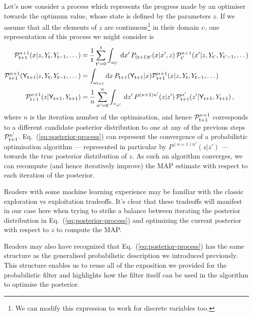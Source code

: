 Let's now consider a process which represents the progress made by an optimiser towards the optimum value, whose state is defined by the parameters $z$. If we assume that all the elements of $z$ are continuous\footnote{We can modify this expression to work for discrete variables too.} in their domain $\upsilon$, one representation of this process we might consider is
\begin{align} 
{\cal P}^{n+1}_{{\sf t}+1}(x\vert z, Y_{{\sf t}}, Y_{{\sf t}-1}, \dots) &= \frac{1}{{\sf t}}\sum_{{\sf t}'=0}^{{\sf t}}\int_{\omega_{{\sf t}'}} \,{\rm d}x' \, P_{({\sf t}+1){\sf t}'}(x\vert x',z)\, {\cal P}^{n+1}_{{\sf t}'}(x'\vert z, Y_{{\sf t}'}, Y_{{\sf t}'-1}, \dots) \\
{\cal P}^{n+1}_{{\sf t}+1}({\sf Y}_{{\sf t}+1} \vert z, Y_{{\sf t}}, Y_{{\sf t}-1}, \dots) &= \int_{\omega_{{\sf t}+1}}{\rm d}x\, P_{{\sf t}+1}({\sf Y}_{{\sf t}+1} \vert x){\cal P}^{n+1}_{{\sf t}+1}(x\vert z, Y_{{\sf t}}, Y_{{\sf t}-1}, \dots) \\
{\cal P}^{n+1}_{{\sf t}+1}(z \vert {\sf Y}_{{\sf t}+1}, Y_{{\sf t}+1}) &= \frac{1}{n}\sum_{n'=0}^n\int_{\upsilon_{n'}} \,{\rm d}z' \, P^{(n+1)n'}(z\vert z')\, {\cal P}^{n'}_{{\sf t}+1}(z'\vert {\sf Y}_{{\sf t}+1}, Y_{{\sf t}+1}) \label{eq:posterior-process} \,,
\end{align}
where $n$ is the iteration number of the optimisation, and hence ${\cal P}^{n+1}_{{\sf t}+1}$ corresponds to a different candidate posterior distribution to one at any of the previous steps ${\cal P}^{n'}_{{\sf t}+1}$. Eq.~(\ref{eq:posterior-process}) can represent the convergence of a probabilistic optimisation algorithm --- represented in particular by $P^{(n+1)n'}(z\vert z')$ --- towards the true posterior distribution of $z$. As such an algorithm converges, we can recompute (and hence iteratively improve) the MAP estimate with respect to each iteration of the posterior.

Readers with some machine learning experience may be familiar with the classic exploration vs exploitation tradeoffs. It's clear that these tradeoffs will manifest in our case here when trying to strike a balance between iterating the posterior distribution in Eq.~(\ref{eq:posterior-process}) and optimizing the current posterior with respect to $z$ to compute the MAP. 

Readers may also have recognized that Eq.~(\ref{eq:posterior-process}) has the same structure as the generalised probabilistic description we introduced previously. This structure enables us to reuse all of the exposition we provided for the probabilistic filter and highlights how the filter itself can be used in the algorithm to optimise the posterior.   

